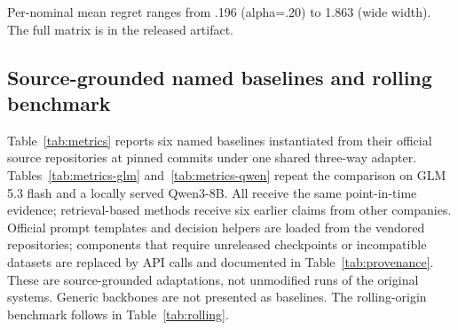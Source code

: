 \documentclass[11pt]{article}
\begin{document}
Per-nominal mean regret ranges from .196 (alpha=.20) to 1.863 (wide width). The full matrix is in the released artifact.

\subsection{Source-grounded named baselines and rolling benchmark}
\label{app:baselines}
Table~\ref{tab:metrics} reports six named baselines instantiated from their
official source repositories at pinned commits under one shared three-way
adapter. Tables~\ref{tab:metrics-glm} and~\ref{tab:metrics-qwen} repeat the
comparison on GLM 5.3 flash and a locally served Qwen3-8B. All receive the same
point-in-time evidence; retrieval-based methods receive six earlier claims from
other companies. Official prompt templates and decision helpers are loaded from
the vendored repositories; components that require unreleased checkpoints or
incompatible datasets are replaced by API calls and documented in
Table~\ref{tab:provenance}. These are source-grounded adaptations, not
unmodified runs of the original systems. Generic backbones are not presented as
baselines. The rolling-origin benchmark follows in Table~\ref{tab:rolling}.
\end{document}
